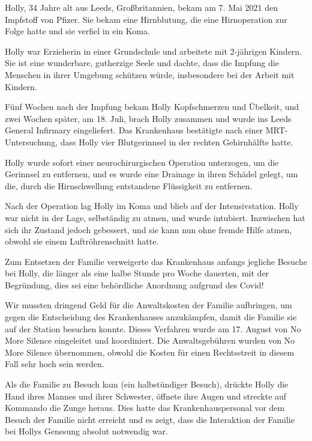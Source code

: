 Holly, 34 Jahre alt aus Leeds, Großbritannien, bekam am 7. Mai 2021 den
Impfstoff von Pfizer. Sie bekam eine Hirnblutung, die eine Hirnoperation zur
Folge hatte und sie verfiel in ein Koma.

Holly war Erzieherin in einer Grundschule und arbeitete mit 2-jährigen
Kindern. Sie ist eine wunderbare, gutherzige Seele und dachte, dass die Impfung
die Menschen in ihrer Umgebung schützen würde, insbesondere bei der Arbeit mit
Kindern.

Fünf Wochen nach der Impfung bekam Holly Kopfschmerzen und Übelkeit, und zwei
Wochen später, am 18. Juli, brach Holly zusammen und wurde ins Leeds General
Infirmary eingeliefert. Das Krankenhaus bestätigte nach einer MRT-Untersuchung,
dass Holly vier Blutgerinnsel in der rechten Gehirnhälfte hatte.

Holly wurde sofort einer neurochirurgischen Operation unterzogen, um die
Gerinnsel zu entfernen, und es wurde eine Drainage in ihren Schädel gelegt, um
die, durch die Hirnschwellung entstandene Flüssigkeit zu entfernen.

Nach der Operation lag Holly im Koma und blieb auf der Intensivstation. Holly
war nicht in der Lage, selbständig zu atmen, und wurde intubiert. Inzwischen hat
sich ihr Zustand jedoch gebessert, und sie kann nun ohne fremde Hilfe atmen,
obwohl sie einem Luftröhrenschnitt hatte.

Zum Entsetzen der Familie verweigerte das Krankenhaus anfangs jegliche Besuche
bei Holly, die länger als eine halbe Stunde pro Woche dauerten, mit der
Begründung, dies sei eine behördliche Anordnung aufgrund des Covid!

Wir mussten dringend Geld für die Anwaltskosten der Familie aufbringen, um gegen
die Entscheidung des Krankenhauses anzukämpfen, damit die Familie sie auf der
Station besuchen konnte. Dieses Verfahren wurde am 17. August von No More
Silence eingeleitet und koordiniert. Die Anwaltsgebühren wurden von No More
Silence übernommen, obwohl die Kosten für einen Rechtsstreit in diesem Fall sehr
hoch sein werden.

Als die Familie zu Besuch kam (ein halbstündiger Besuch), drückte Holly die Hand
ihres Mannes und ihrer Schwester, öffnete ihre Augen und streckte auf Kommando
die Zunge heraus. Dies hatte das Krankenhauspersonal vor dem Besuch der Familie
nicht erreicht und es zeigt, dass die Interaktion der Familie bei Hollys
Genesung absolut notwendig war.
